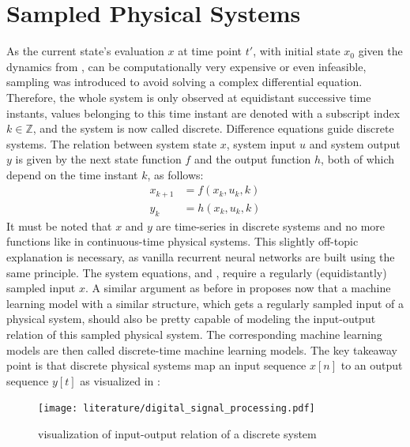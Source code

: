 \documentclass[draft,final]{vutinfth} %
\begin{document}
    \section{Sampled Physical Systems} \label{sampled_physical_systems}
    As the current state's evaluation $x$ at time point $t'$, with initial state $x_0$ given the dynamics from , can be computationally very expensive or even infeasible, sampling was introduced to avoid solving a complex differential equation.
    Therefore, the whole system is only observed at equidistant successive time instants, values belonging to this time instant are denoted with a subscript index $k \in \mathbb{Z}$, and the system is now called discrete.
    Difference equations guide discrete systems. The relation between system state $x$, system input $u$ and system output $y$ is given by the next state function $f$ and the output function $h$, both of which depend on the time instant $k$, as follows:
    \begin{align}
        \label{discrete_system_equations_state}
        x_{k+1} &= f(x_k,u_k,k) \\
        \label{discrete_system_equations_output}
        y_k &= h(x_k,u_k,k)
    \end{align}
    It must be noted that $x$ and $y$ are time-series in discrete systems and no more functions like in continuous-time physical systems.
    This slightly off-topic explanation is necessary, as vanilla recurrent neural networks are built using the same principle.
    The system equations,  and , require a regularly (equidistantly) sampled input $x$.
    A similar argument as before in  proposes now that a machine learning model with a similar structure, which gets a regularly sampled input of a physical system, should also be pretty capable of modeling the input-output relation of this sampled physical system.
    The corresponding machine learning models are then called discrete-time machine learning models.
    The key takeaway point is that discrete physical systems map an input sequence $x[n]$ to an output sequence $y[t]$ as visualized in \cite[p. 102]{dsp}:
    \begin{figure}[H]
        \centering{}
        \texttt{[image: literature/digital\_signal\_processing.pdf]}
        \caption{visualization of input-output relation of a discrete system}
        \label{fig:discrete_system_vis}
    \end{figure}
\end{document}
